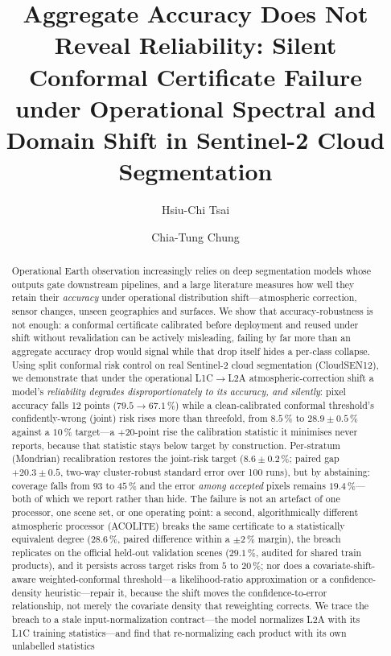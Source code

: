 \documentclass[preprint,3p,times]{elsarticle}
\begin{document}
\begin{frontmatter}

\title{Aggregate Accuracy Does Not Reveal Reliability: Silent Conformal Certificate Failure under Operational Spectral and Domain Shift in Sentinel-2 Cloud Segmentation}

\author[a]{Hsiu-Chi Tsai}
\author[b]{Chia-Tung Chung}

\begin{abstract}
Operational Earth observation increasingly relies on deep segmentation models whose outputs gate downstream pipelines, and a large literature measures how well they retain their \emph{accuracy} under operational distribution shift---atmospheric correction, sensor changes, unseen geographies and surfaces. We show that accuracy-robustness is not enough: a conformal certificate calibrated before deployment and reused under shift without revalidation can be actively misleading, failing by far more than an aggregate accuracy drop would signal while that drop itself hides a per-class collapse. Using split conformal risk control on real Sentinel-2 cloud segmentation (CloudSEN12), we demonstrate that under the operational L1C$\to$L2A atmospheric-correction shift a model's \emph{reliability degrades disproportionately to its accuracy, and silently}: pixel accuracy falls 12 points ($79.5 \to 67.1\,\%$) while a clean-calibrated conformal threshold's confidently-wrong (joint) risk rises more than threefold, from $8.5\,\%$ to $28.9 \pm 0.5\,\%$ against a $10\,\%$ target---a $+20$-point rise the calibration statistic it minimises never reports, because that statistic stays below target by construction. Per-stratum (Mondrian) recalibration restores the joint-risk target ($8.6 \pm 0.2\,\%$; paired gap $+20.3 \pm 0.5$, two-way cluster-robust standard error over 100 runs), but by abstaining: coverage falls from $93$ to $45\,\%$ and the error \emph{among accepted} pixels remains $19.4\,\%$---both of which we report rather than hide. The failure is not an artefact of one processor, one scene set, or one operating point: a second, algorithmically different atmospheric processor (ACOLITE) breaks the same certificate to a statistically equivalent degree ($28.6\,\%$, paired difference within a $\pm2\,\%$ margin), the breach replicates on the official held-out validation scenes ($29.1\,\%$, audited for shared train products), and it persists across target risks from $5$ to $20\,\%$; nor does a covariate-shift-aware weighted-conformal threshold---a likelihood-ratio approximation or a confidence-density heuristic---repair it, because the shift moves the confidence-to-error relationship, not merely the covariate density that reweighting corrects. We trace the breach to a stale input-normalization contract---the model normalizes L2A with its L1C training statistics---and find that re-normalizing each product with its own unlabelled statistics 
\end{abstract}
\end{frontmatter}
\end{document}
